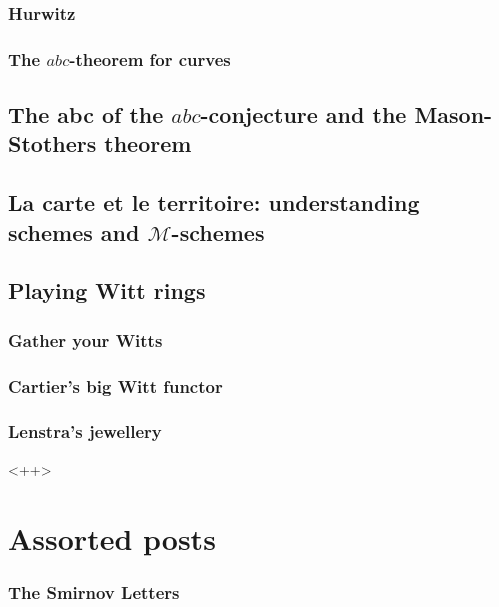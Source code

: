 \documentclass[a4paper]{memoir}
\begin{document}
\section{Hurwitz}
\section{The $abc$-theorem for curves}



\chapter{The abc of the $abc$-conjecture and the Mason-Stothers theorem}





\chapter{La carte et le territoire: understanding schemes and $\mathcal{M}$-schemes}








\chapter{Playing Witt rings}
\section{Gather your Witts}
\section{Cartier's big Witt functor}
\section{Lenstra's jewellery}<++>






\part{Assorted posts}

\setcounter{section}{0}

\section{The Smirnov Letters}
\end{document}
